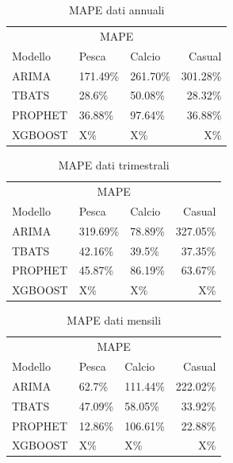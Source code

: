 \documentclass[12pt, a4paper, twocolumn]{article} %
\begin{document}
\begin{table}[H]
\caption{MAPE dati annuali}
\centering
	\begin{tabular}{lllr}
		\toprule
		\multicolumn{4}{c}{MAPE} \\
		\cmidrule(r){2-4}
			Modello & Pesca & Calcio & Casual \\
		\midrule
			ARIMA & 171.49\% & 261.70\% & 301.28\% \\
			TBATS & 28.6\% & 50.08\% & 28.32\% \\
			PROPHET & 36.88\% & 97.64\% & 36.88\% \\
			XGBOOST & X\% & X\% & X\% \\
		\bottomrule
	\end{tabular}
\end{table}

\begin{table}[H]
	\caption{MAPE dati trimestrali}
	\centering
		\begin{tabular}{lllr}
			\toprule
			\multicolumn{4}{c}{MAPE} \\
			\cmidrule(r){2-4}
				Modello & Pesca & Calcio & Casual \\
			\midrule
				ARIMA & 319.69\% & 78.89\% & 327.05\% \\
				TBATS & 42.16\% & 39.5\% & 37.35\% \\
				PROPHET & 45.87\% & 86.19\% & 63.67\% \\
				XGBOOST & X\% & X\% & X\% \\
			\bottomrule
		\end{tabular}
	\end{table}

	\begin{table}[H]
		\caption{MAPE dati mensili}
		\centering
			\begin{tabular}{lllr}
				\toprule
				\multicolumn{4}{c}{MAPE} \\
				\cmidrule(r){2-4}
					Modello & Pesca & Calcio & Casual \\
				\midrule
					ARIMA & 62.7\% & 111.44\% & 222.02\% \\
					TBATS & 47.09\% & 58.05\% & 33.92\% \\
					PROPHET & 12.86\% & 106.61\% & 22.88\% \\
					XGBOOST & X\% & X\% & X\% \\
				\bottomrule
			\end{tabular}
		\end{table}
		
\end{document}
